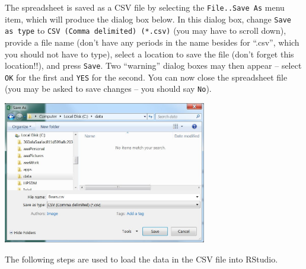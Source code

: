 \documentclass[10pt,openany]{book}\usepackage[]{graphicx}\usepackage[]{color}
\begin{document}
The spreadsheet is saved as a CSV file by selecting the \verb"File..Save As" menu item, which will produce the dialog box below. In this dialog box, change \verb"Save as type" to \verb"CSV (Comma delimited) (*.csv)" (you may have to scroll down), provide a file name (don't have any periods in the name besides for ``.csv'', which you should not have to type), select a location to save the file (don't forget this location!!), and press \verb"Save". Two ``warning'' dialog boxes may then appear -- select \verb"OK" for the first and \verb"YES" for the second. You can now close the spreadsheet file (you may be asked to save changes -- you should say \verb"No").
\begin{center}
  \includegraphics[width=3.5in]{Figs/Data_File_2.jpg}
\end{center}

The following steps are used to load the data in the CSV file into RStudio.
\end{document}
